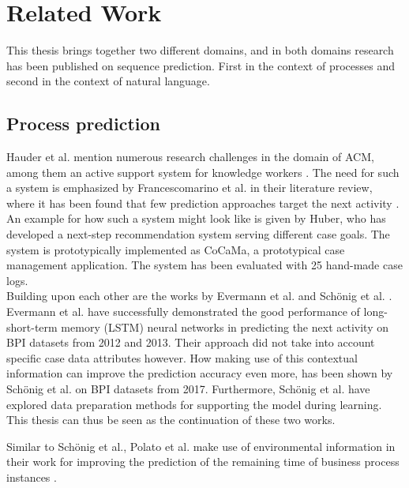\chapter{Related Work}\label{sec:related-work}
This thesis brings together two different domains, and in both domains research has been published on sequence prediction. First in the context of processes and second in the context of natural language.

\section{Process prediction}
Hauder et al. mention numerous research challenges in the domain of ACM, among them an active support system for knowledge workers \cite{hauder2014}.
The need for such a system is emphasized by Francescomarino et al. in their literature review, where it has been found that few prediction approaches target the next activity \cite{francescomarino2018}.\\

An example for how such a system might look like is given by Huber, who has developed a next-step recommendation system serving different case goals.
The system is prototypically implemented as CoCaMa, a prototypical case management application. The system has been evaluated with 25 hand-made case logs.\\

Building upon each other are the works by Evermann et al. \cite{evermann2016} and Schönig et al. \cite{schoenig2018}. Evermann et al. have successfully demonstrated the good performance of long-short-term memory (LSTM) neural networks in predicting the next activity on BPI datasets from 2012 and 2013. Their approach did not take into account specific case data attributes however. How making use of this contextual information can improve the prediction accuracy even more, has been shown by Schönig et al. \cite{schoenig2018} on BPI datasets from 2017. Furthermore, Schönig et al. have explored data preparation methods for supporting the model during learning.
This thesis can thus be seen as the continuation of these two works.

Similar to Schönig et al., Polato et al. make use of environmental information in their work for improving the prediction of the remaining time of business process instances \cite{polato2014}.\\

